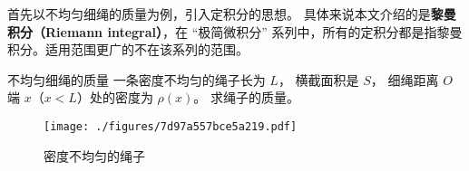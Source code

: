 

首先以不均匀细绳的质量为例，引入定积分的思想。 具体来说本文介绍的是\textbf{黎曼积分（Riemann integral）}，在 “极简微积分” 系列中，所有的定积分都是指黎曼积分。适用范围更广的不在该系列的范围。

\begin{example}{不均匀细绳的质量}\label{ex_DefInt_1}
一条密度不均匀的绳子长为 $L$， 横截面积是 $S$， 细绳距离 $O$ 端 $x$（$x < L$）处的密度为 $\rho(x)$。 求绳子的质量。

\begin{figure}[ht]
\centering
\texttt{[image: ./figures/7d97a557bce5a219.pdf]}
\caption{密度不均匀的绳子} \label{fig_DefInt_1}
\end{figure}


\end{example}
